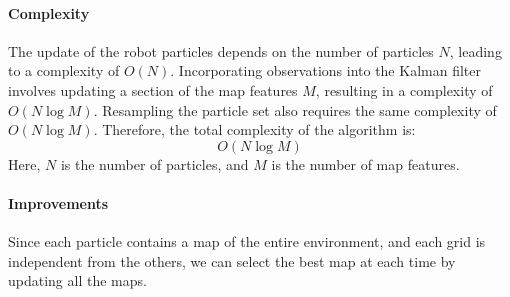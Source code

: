 \paragraph*{Complexity}
The update of the robot particles depends on the number of particles $N$, leading to a complexity of $O(N)$. 
Incorporating observations into the Kalman filter involves updating a section of the map features $M$, resulting in a complexity of $O(N\log M)$. 
Resampling the particle set also requires the same complexity of $O(N\log M)$. 
Therefore, the total complexity of the algorithm is:
\[O(N\log M)\]
Here, $N$ is the number of particles, and $M$ is the number of map features.

\paragraph{Improvements}
Since each particle contains a map of the entire environment, and each grid is independent from the others, we can select the best map at each time by updating all the maps.
